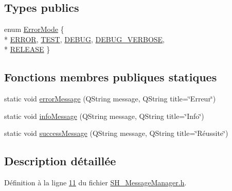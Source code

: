 \subsection*{Types publics}
\begin{DoxyCompactItemize}
\item 
enum \hyperlink{classSH__MessageManager_a13742daa1342475d4fcee295b9dee4ee}{Error\-Mode} \{ \\*
\hyperlink{classSH__MessageManager_a13742daa1342475d4fcee295b9dee4eeaed8e377759e5f203a417dbd267cbc33a}{E\-R\-R\-O\-R}, 
\hyperlink{classSH__MessageManager_a13742daa1342475d4fcee295b9dee4eea20e4a860505461ef78ebb902cac1bbc7}{T\-E\-S\-T}, 
\hyperlink{classSH__MessageManager_a13742daa1342475d4fcee295b9dee4eeac1f651f46ed4faeccbb6ce75f31c6123}{D\-E\-B\-U\-G}, 
\hyperlink{classSH__MessageManager_a13742daa1342475d4fcee295b9dee4eea10b19d57d9a8572101d39b51cdca79d0}{D\-E\-B\-U\-G\-\_\-\-V\-E\-R\-B\-O\-S\-E}, 
\\*
\hyperlink{classSH__MessageManager_a13742daa1342475d4fcee295b9dee4eea81df11b9abe47d3c95d300a3ff71227e}{R\-E\-L\-E\-A\-S\-E}
 \}
\end{DoxyCompactItemize}
\subsection*{Fonctions membres publiques statiques}
\begin{DoxyCompactItemize}
\item 
static void \hyperlink{classSH__MessageManager_acb5615cc90f198f4768da800a5d32362}{error\-Message} (Q\-String message, Q\-String title=\char`\"{}Erreur\char`\"{})
\item 
static void \hyperlink{classSH__MessageManager_a5d9271c143593ccfddce6162b84f8207}{info\-Message} (Q\-String message, Q\-String title=\char`\"{}Info\char`\"{})
\item 
static void \hyperlink{classSH__MessageManager_a7d69b7cb8082f97cd3b6c8d446058959}{success\-Message} (Q\-String message, Q\-String title=\char`\"{}Réussite\char`\"{})
\end{DoxyCompactItemize}


\subsection{Description détaillée}


Définition à la ligne \hyperlink{SH__MessageManager_8h_source_l00011}{11} du fichier \hyperlink{SH__MessageManager_8h_source}{S\-H\-\_\-\-Message\-Manager.\-h}.



